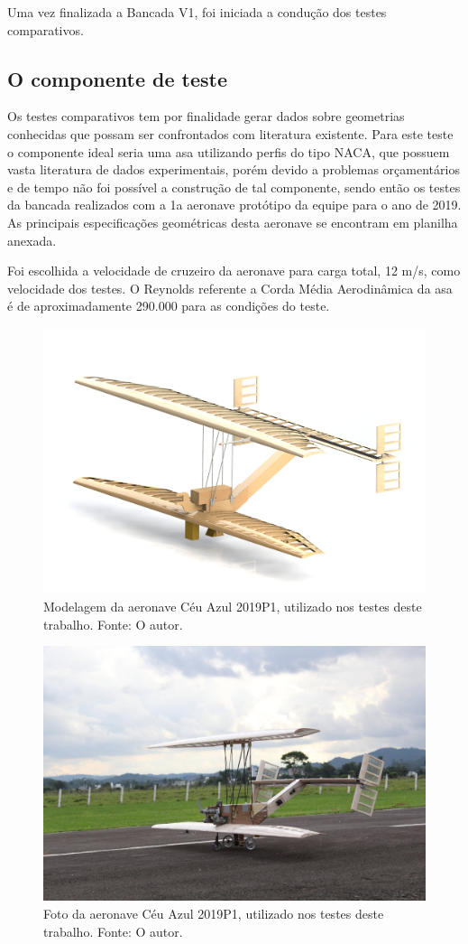 Uma vez finalizada a Bancada V1, foi iniciada a condução dos testes comparativos.

\subsection{O componente de teste}

Os testes comparativos tem por finalidade gerar dados sobre geometrias conhecidas que possam ser confrontados com literatura existente. Para este teste o componente ideal seria uma asa utilizando perfis do tipo NACA, que possuem vasta literatura de dados experimentais, porém devido a problemas orçamentários e de tempo não foi possível a construção de tal componente, sendo então os testes da bancada realizados com a 1a aeronave protótipo da equipe para o ano de 2019. As principais especificações geométricas desta aeronave se encontram em planilha anexada.

Foi escolhida a velocidade de cruzeiro da aeronave para carga total, 12 m/s, como velocidade dos testes. O Reynolds referente a Corda Média Aerodinâmica da asa é de aproximadamente 290.000 para as condições do teste.

\begin{figure}[!ht]
    \centering
    \includegraphics[width=.6\linewidth]{figuras/renders/aviao_sozinho.png}
    \caption{Modelagem da aeronave Céu Azul 2019P1, utilizado nos testes deste trabalho. Fonte: O autor.}
    \label{fig:aviao_renderizado}
\end{figure}

\begin{figure}[!ht]
    \centering
    \includegraphics[width=.6\linewidth]{figuras/testes/prototipo_construido.JPG}
    \caption{Foto da aeronave Céu Azul 2019P1, utilizado nos testes deste trabalho. Fonte: O autor.}
    \label{fig:aviao_construido}
\end{figure}

